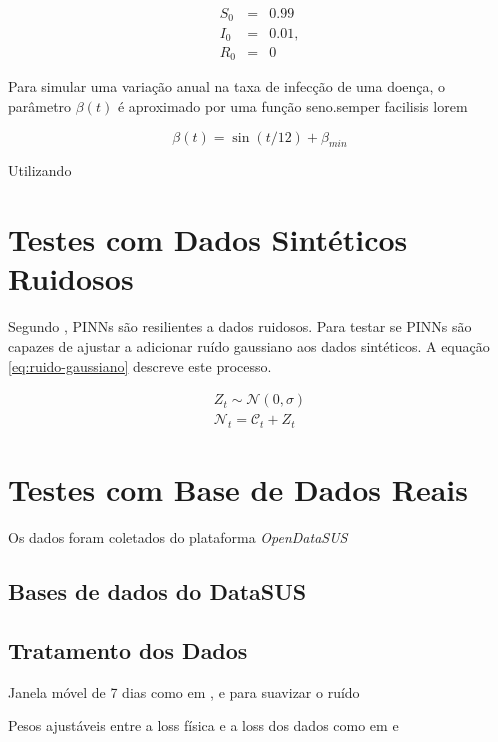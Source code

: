 \begin{eqnarray}
   S_0 &=& 0.99 \label{eq:S0}\\
   I_0 &=& 0.01, \label{eq:I0}\\
   R_0 &=& 0 \label{eq:R0}
\end{eqnarray}

Para simular uma variação anual na taxa de infecção de uma doença, o parâmetro
$\beta(t)$ é aproximado por uma função seno.semper facilisis lorem 

\begin{equation} \label{eq:beta_t_sintetetico}
    \beta(t) = \sin(t / 12)  + \beta_{min}
\end{equation}

Utilizando

\section{Testes com Dados Sintéticos Ruidosos}

Segundo \cite{raissi-etal:19}, PINNs são resilientes a dados ruidosos. Para
testar se PINNs são capazes de ajustar a 
adicionar ruído gaussiano aos dados sintéticos. A equação \ref{eq:ruido-gaussiano}
descreve este processo.

\begin{eqnarray}\label{eq:ruido-gaussiano}
    Z_t \sim \mathcal{N}(0, \sigma) \\
    \mathcal{N}_t = \mathcal{C}_t + Z_t  
\end{eqnarray}

\section{Testes com Base de Dados Reais}

Os dados foram coletados do plataforma \textit{OpenDataSUS} \cite{opendatasus}


\subsection{Bases de dados do DataSUS}

\subsection{Tratamento dos Dados}
Janela móvel de 7 dias como em \cite{han-etal:24-prim-artigo-alemanha},
\cite{long-etal:21-L2} e \cite{shamsara-etal:25-omicron} para suavizar o ruído

Pesos ajustáveis entre a loss física e a loss dos dados como em \cite{long-etal:21-L2} e 
\cite{shamsara-etal:25-omicron}

